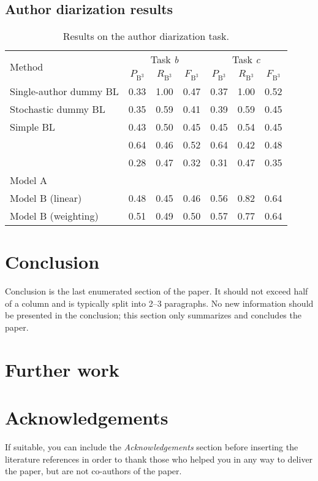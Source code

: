 \documentclass[10pt, a4paper]{article}
\begin{document}
\subsection{Author diarization results}

\begin{table*}
	\caption{Results on the author diarization task.}
	\label{tab:narrow-table}
	\begin{center}
		\begin{tabular}{l|ccc|ccc}
			\toprule
			\multirow{2}{*}{Method} & \multicolumn{3}{c|}{Task \emph{b}} & \multicolumn{3}{c}{Task \emph{c}} \\
			\cmidrule{2-7}
			& $P_{\mathrm{B}^3}$ & $R_{\mathrm{B}^3}$ & $F_\mathrm{\mathrm{B}^3}$ & $P_{\mathrm{B}^3}$ & $R_{\mathrm{B}^3}$ & $F_\mathrm{\mathrm{B}^3}$ \\
			\midrule
			Single-author dummy BL 		& 0.33 & 1.00 & 0.47 & 0.37 & 1.00 & 0.52 \\
			Stochastic dummy BL 		& 0.35 & 0.59 & 0.41 & 0.39 & 0.59 & 0.45 \\
			Simple BL 					& 0.43 & 0.50 & 0.45 & 0.45 & 0.54 & 0.45 \\
			\midrule
			\citet{kuznetsov-2016}		& 0.64 & 0.46 & 0.52 & 0.64 & 0.42 & 0.48 \\
			\citet{sittar-2016} 		& 0.28 & 0.47 & 0.32 & 0.31 & 0.47 & 0.35 \\
			\midrule			
			Model A 					&  &  &  &  &  & \\			
			Model B (linear) 			& 0.48 & 0.45 & 0.46 & 0.56 & 0.82 & 0.64 \\
			Model B (weighting)			& 0.51 & 0.49 & 0.50 & 0.57 & 0.77 & 0.64 \\
			\bottomrule
		\end{tabular}
	\end{center}
\end{table*}

\section{Conclusion}

Conclusion is the last enumerated section of the paper. It should not exceed half of a column and is typically split into 2--3 paragraphs. No new information should be presented in the conclusion; this section only summarizes and concludes the paper.

\section{Further work}

\section*{Acknowledgements}

If suitable, you can include the \emph{Acknowledgements} section before inserting the literature references  in order to thank those who helped you in any way to deliver the paper, but are not co-authors of the paper.




\end{document}
